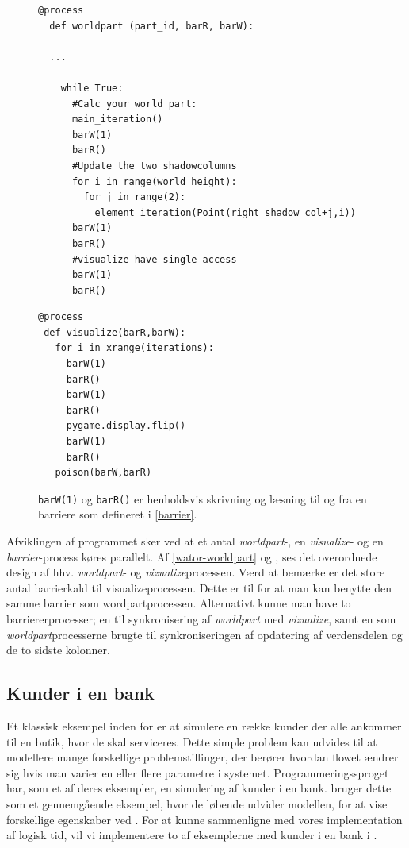 \begin{figure}[hbtp]
\begin{minipage}{\linewidth}
\begin{lstlisting}[label=wator-worldpart,caption=Uddrag af processen 
  \emph{worldpart} i Wator]
  @process
  def worldpart (part_id, barR, barW):
  
  ...
  
    while True:
      #Calc your world part:
      main_iteration()
      barW(1)
      barR()
      #Update the two shadowcolumns
      for i in range(world_height):
        for j in range(2):
          element_iteration(Point(right_shadow_col+j,i))
      barW(1)
      barR()
      #visualize have single access
      barW(1)
      barR()
\end{lstlisting}

\begin{lstlisting}[label=wator-visualize,caption=Processen \emph{visualize} i 
  Wator]
@process
 def visualize(barR,barW):
   for i in xrange(iterations):
     barW(1)
     barR()
     barW(1)
     barR()
     pygame.display.flip()
     barW(1)
     barR()
   poison(barW,barR)
\end{lstlisting}

\end{minipage}
\caption[test]{\texttt{barW(1)} og \texttt{barR()} er henholdsvis skrivning og læsning til og 
fra en barriere som defineret i \cref{barrier}.}
\end{figure}
Afviklingen af programmet sker ved at et antal \emph{worldpart}-, en 
\emph{visualize}- og en \emph{barrier}-process køres parallelt. Af 
 \autoref{wator-worldpart} og \pageref{wator-visualize}, ses det overordnede design af hhv. \emph{worldpart}- og \emph{vizualize}processen.  Værd at bemærke er det store antal barrierkald til visualizeprocessen. Dette er til for at man kan benytte den samme barrier som wordpartprocessen. Alternativt kunne man have to barriererprocesser; en til synkronisering af \emph{worldpart} med \emph{vizualize}, samt en som \emph{worldpart}processerne brugte til synkroniseringen af opdatering af verdensdelen og de to sidste kolonner. 



\subsection{Kunder i en bank}\label{bank-eksempel}
Et klassisk eksempel inden for \des er at simulere  en række kunder der alle 
ankommer til en butik, hvor de skal serviceres. Dette simple problem kan 
udvides til at modellere mange forskellige problemstillinger, der berører 
hvordan flowet ændrer sig hvis man varier en eller flere parametre
i systemet. Programmeringssproget \simpy{}har, som et af deres 
eksempler, en simulering af kunder i en bank. \simpy bruger dette som et 
gennemgående eksempel, hvor de løbende udvider modellen, for at vise 
forskellige egenskaber ved \simpy. For at kunne sammenligne \simpy  med vores 
implementation af logisk tid, vil vi implementere to af eksemplerne med kunder 
i en bank i \pycsp.

